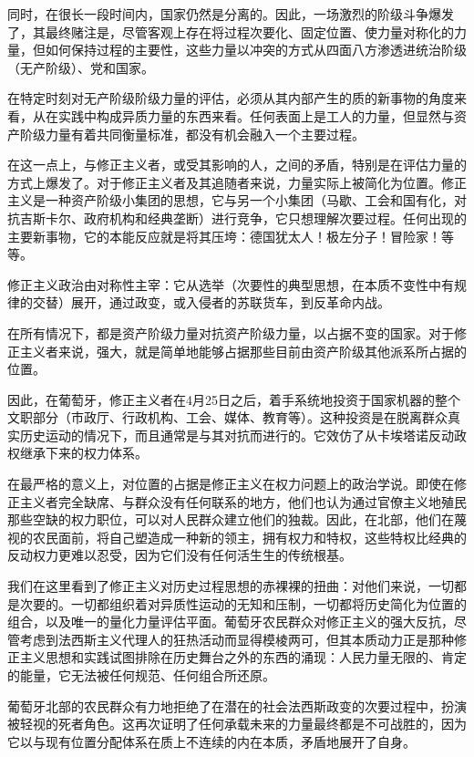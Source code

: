 \documentclass[fontset=fandol, a4paper, 12pt, twoside]{ctexart}
\begin{document}
同时，在很长一段时间内，国家仍然是分离的。因此，一场激烈的阶级斗争爆发了，其最终赌注是，尽管客观上存在将过程次要化、固定位置、使力量对称化的力量，但如何保持过程的主要性，这些力量以冲突的方式从四面八方渗透进统治阶级（无产阶级）、党和国家。

在特定时刻对无产阶级阶级力量的评估，必须从其内部产生的质的新事物的角度来看，从在实践中构成异质力量的东西来看。任何表面上是工人的力量，但显然与资产阶级力量有着共同衡量标准，都没有机会融入一个主要过程。

在这一点上，与修正主义者，或受其影响的人，之间的矛盾，特别是在评估力量的方式上爆发了。对于修正主义者及其追随者来说，力量实际上被简化为位置。修正主义是一种资产阶级小集团的思想，它与另一个小集团（马歇、工会和国有化，对抗吉斯卡尔、政府机构和经典垄断）进行竞争，它只想理解次要过程。任何出现的主要新事物，它的本能反应就是将其压垮：德国犹太人！极左分子！冒险家！等等。

修正主义政治由对称性主宰：它从选举（次要性的典型思想，在本质不变性中有规律的交替）展开，通过政变，或入侵者的苏联货车，到反革命内战。

在所有情况下，都是资产阶级力量对抗资产阶级力量，以占据不变的国家。对于修正主义者来说，强大，就是简单地能够占据那些目前由资产阶级其他派系所占据的位置。

因此，在葡萄牙，修正主义者在4月25日之后，着手系统地投资于国家机器的整个文职部分（市政厅、行政机构、工会、媒体、教育等）。这种投资是在脱离群众真实历史运动的情况下，而且通常是与其对抗而进行的。它效仿了从卡埃塔诺反动政权继承下来的权力体系。

在最严格的意义上，对位置的占据是修正主义在权力问题上的政治学说。即使在修正主义者完全缺席、与群众没有任何联系的地方，他们也认为通过官僚主义地殖民那些空缺的权力职位，可以对人民群众建立他们的独裁。因此，在北部，他们在蔑视的农民面前，将自己塑造成一种新的领主，拥有权力和特权，这些特权比经典的反动权力更难以忍受，因为它们没有任何活生生的传统根基。

我们在这里看到了修正主义对历史过程思想的赤裸裸的扭曲：对他们来说，一切都是次要的。一切都组织着对异质性运动的无知和压制，一切都将历史简化为位置的组合，以及唯一的量化力量评估平面。葡萄牙农民群众对修正主义的强大反抗，尽管考虑到法西斯主义代理人的狂热活动而显得模棱两可，但其本质动力正是那种修正主义思想和实践试图排除在历史舞台之外的东西的涌现：人民力量无限的、肯定的能量，它无法被任何规范、任何组合所还原。

葡萄牙北部的农民群众有力地拒绝了在潜在的社会法西斯政变的次要过程中，扮演被轻视的死者角色。这再次证明了任何承载未来的力量最终都是不可战胜的，因为它以与现有位置分配体系在质上不连续的内在本质，矛盾地展开了自身。
\end{document}
